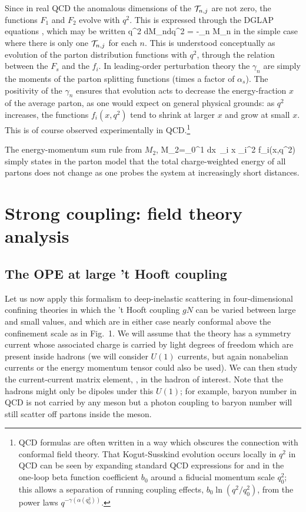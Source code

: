 Since in real QCD the anomalous dimensions of the ${\cal T}_{n,j}$ are not
zero, the functions $F_1$ and $F_2$ evolve with $q^2$.  This is
expressed through the DGLAP equations \cite{DGLAP}, which may be
written
%
q^2 {dM_n\over dq^2} = -\half\gamma_n M_n
\ee
%
in the simple case where there is only one ${\cal T}_{n,j}$ for each $n$.
This is understood conceptually as evolution of the parton
distribution functions with $q^2$, through the relation between the
$F_s$ and the $f_i$.  In leading-order perturbation theory the
$\gamma_n$ are simply the moments of the parton splitting functions
(times a factor of $\alpha_s$).  The positivity of the $\gamma_n$
ensures that evolution acts to decrease the energy-fraction $x$ of the
average parton, as one would expect on general physical grounds: as
$q^2$ increases, the functions $f_i(x,q^2)$ tend to shrink at larger
$x$ and grow at small $x$.  This is of course observed experimentally
in QCD.\footnote{QCD formulas are often written in a way which
obscures the connection with conformal field theory. That
Kogut-Susskind evolution occurs locally in $q^2$ in QCD can be seen
by expanding standard QCD expressions for  and 
in the one-loop beta function coefficient $b_0$ around a fiducial
momentum scale $q_0^2$; this allows a separation of running coupling
effects, $b_0\ln (q^2/q_0^2)$, from the power laws
$q^{-\gamma (\alpha(q_0^2))}$.}

The
energy-momentum sum
rule from $M_2$,
M_2=\int_0^1 dx\ \sum_i x \QQ_i^2 f_i(x,q^2) 
\ee
simply states in the parton model that the total charge-weighted energy of all
partons  does not change as one probes the system at increasingly short
distances.


\section{Strong coupling: field theory analysis}



\subsection{The OPE at large 't Hooft coupling}

Let us now apply this formalism to deep-inelastic scattering
in four-dimensional
confining theories in which the
't Hooft coupling  $g N$ can be varied between large and small values,  and
which are in either case nearly conformal above the confinement scale as in
Fig.~1.
We will assume that the theory has a symmetry
current
whose associated charge is carried by light degrees of freedom which
are present inside hadrons (we will consider $U(1)$ currents, but again
nonabelian currents or the energy momentum tensor could also be 
used).   We can then study the
current-current matrix element, , in the hadron of
interest.
Note that the hadrons might only be
dipoles under this $U(1)$; for example, baryon number in QCD is not
carried by any meson but a photon coupling to baryon number will still
scatter off partons inside the meson.

